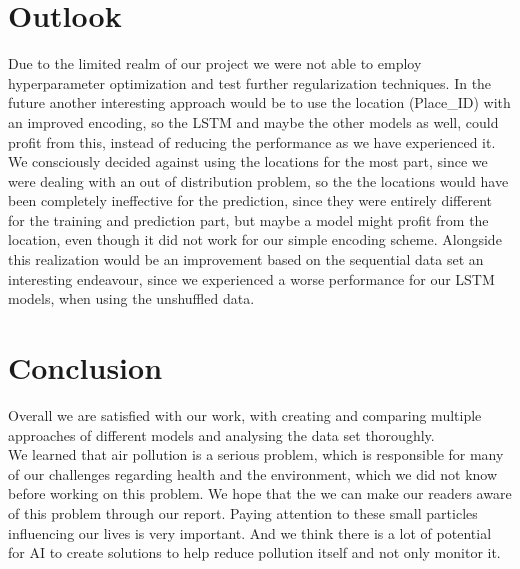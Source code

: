 \documentclass{article}
\begin{document}
\section{Outlook}
Due to the limited realm of our project we were not able to employ hyperparameter optimization and test further regularization techniques. In the future another interesting approach would be to use the location {\selectfont (Place\_ID) }with an improved encoding, so the LSTM and maybe the other models as well, could profit from this, instead of reducing the performance as we have experienced it. We consciously decided against using the locations for the most part, since we were dealing with an out of distribution problem, so the the locations would have been completely ineffective for the prediction, since they were entirely different for the training and prediction part, but maybe a model might profit from the location, even though it did not work for our simple encoding scheme. Alongside this realization would be an improvement based on the sequential data set an interesting endeavour, since we experienced a worse performance for our LSTM models, when using the unshuffled data.


\section{Conclusion}
Overall we are satisfied with our work, with creating and comparing multiple approaches of different models and analysing the data set thoroughly. \\
We learned that air pollution is a serious problem, which is responsible for many of our challenges regarding health and the environment, which we did not know before working on this problem. We hope that the we can make our readers aware of this problem through our report. Paying attention to these small particles influencing our lives is very important. And we think there is a lot of potential for AI to create solutions to help reduce pollution itself and not only monitor it. \\
\newpage


\end{document}
